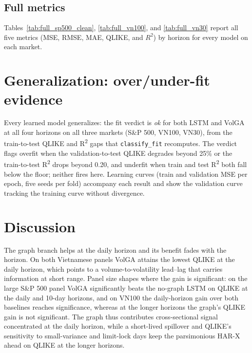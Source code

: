 \documentclass{llncs}
\begin{document}
\subsection{Full metrics}
Tables~\ref{tab:full_sp500_clean}, \ref{tab:full_vn100}, and \ref{tab:full_vn30} report all five metrics
(MSE, RMSE, MAE, QLIKE, and $R^2$) by horizon for every model on each market.




\section{Generalization: over/under-fit evidence}\label{sec:overfit}
Every learned model generalizes: the fit verdict is \emph{ok} for both LSTM and VolGA at all four horizons on
all three markets (S\&P 500, VN100, VN30), from the train-to-test QLIKE and R\textsuperscript{2} gaps that
\texttt{classify\_fit} recomputes. The verdict flags overfit when the validation-to-test QLIKE degrades beyond
25\% or the train-to-test R\textsuperscript{2} drops beyond 0.20, and underfit when train and test
R\textsuperscript{2} both fall below the floor; neither fires here. Learning curves (train and validation MSE
per epoch, five seeds per fold) accompany each result and show the validation curve tracking the training
curve without divergence.

\section{Discussion}\label{sec:disc}
The graph branch helps at the daily horizon and its benefit fades with the horizon. On both Vietnamese panels
VolGA attains the lowest QLIKE at the daily horizon, which points to a volume-to-volatility lead--lag that
carries information at short range. Panel size shapes where the gain is significant: on the large S\&P 500 panel
VolGA significantly beats the no-graph LSTM on QLIKE at the daily and 10-day horizons, and on VN100 the
daily-horizon gain over both baselines reaches significance, whereas at the longer horizons the graph's QLIKE
gain is not significant. The graph thus contributes cross-sectional signal concentrated at the daily horizon,
while a short-lived spillover and QLIKE's sensitivity to small-variance and limit-lock days keep the
parsimonious HAR-X ahead on QLIKE at the longer horizons.
\end{document}
